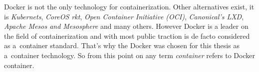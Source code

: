 Docker is not the only technology for containerization. Other alternatives exist, it is \textit{Kubernets}, \textit{CoreOS rkt}, 
\textit{Open Container Initiative (OCI)}, \textit{Canonical's LXD}, \textit{Apache Mesos and Mesosphere} and many others. 
However Docker is a leader on the field of containerization and with most public traction is de facto considered as a~container standard.
That's why the Docker was chosen for this thesis as a~container technology. So from this point on any term \textit{container} refers to
Docker container.

\begin{figure}[h!]
\centering
\begin{floatrow}
\end{floatrow}
\end{figure}

\begin{figure}[h!]
\centering
\begin{floatrow}
\end{floatrow}
\end{figure}

